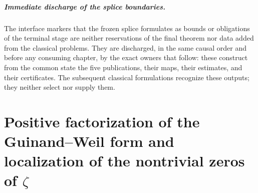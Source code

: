 \paragraph{Immediate discharge of the splice boundaries.}
The interface markers that the frozen splice formulates as bounds or
obligations of the terminal stage are neither reservations of the final theorem nor data
added from the classical problems. They are discharged, in the same causal
order and before any consuming chapter, by the exact owners
that follow: these construct from the common state the five publications,
their maps, their estimates, and their certificates. The subsequent classical
formulations recognize these outputs; they neither select nor supply them.
\begin{HMTScientificOwnerSubordinated}

\end{HMTScientificOwnerSubordinated}


\begingroup
\HMTDemoteHeadings

\endgroup

\HMTFlushCurrentChapter
\chapter{Positive factorization of the Guinand--Weil form and localization of the nontrivial zeros of \texorpdfstring{\(\zeta\)}{zeta}}
\begingroup
\renewcommand{\chapter}[2][]{}%

\endgroup


\HMTFlushCurrentChapter
\chapter{Cayley--Pontryagin characterization of the critical zeros and coinductive construction of the Weil spectral field}
\begingroup
\renewcommand{\chapter}[2][]{}%

\endgroup


